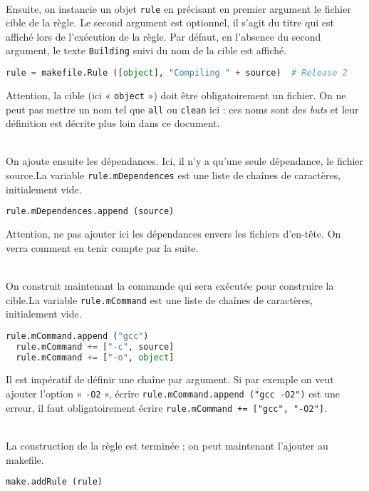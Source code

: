 \documentclass[a4paper,11pt]{extarticle}
\begin{document}
~\\Ensuite, on instancie un objet \texttt{rule} en précisant en premier argument le fichier cible de la règle. Le second argument est optionnel, il s'agit du titre qui est affiché lors de l'exécution de la règle. Par défaut, en l'absence du second argument, le texte \texttt{Building} suivi du nom de la cible est affiché. 
\begin{lstlisting}[language=py]
  rule = makefile.Rule ([object], "Compiling " + source)  # Release 2
\end{lstlisting}
Attention, la cible (ici « \texttt{object} ») doit être obligatoirement un fichier. On ne peut pas mettre un nom tel que \texttt{all} ou \texttt{clean} ici : ces noms sont des \emph{buts} et leur définition est décrite plus loin dans ce document.

~\\On ajoute ensuite les dépendances. Ici, il n'y a qu'une seule dépendance, le fichier source.La variable \texttt{rule.mDependences} est une liste de chaînes de caractères, initialement vide.
\begin{lstlisting}[language=py]
  rule.mDependences.append (source)
\end{lstlisting}
Attention, ne pas ajouter ici les dépendances envers les fichiers d'en-tête. On verra comment en tenir compte par la suite.

~\\On construit maintenant la commande qui sera exécutée pour construire la cible.La variable \texttt{rule.mCommand} est une liste de chaînes de caractères, initialement vide.
\begin{lstlisting}[language=py]
  rule.mCommand.append ("gcc")
  rule.mCommand += ["-c", source]
  rule.mCommand += ["-o", object]
\end{lstlisting}
Il est impératif de définir une chaîne par argument. Si par exemple on veut ajouter l'option « \texttt{-O2} », écrire \texttt{rule.mCommand.append ("gcc -O2")} est une erreur, il faut obligatoirement écrire \texttt{rule.mCommand += ["gcc", "-O2"]}.

~\\La construction de la règle est terminée ; on peut maintenant l'ajouter au makefile.
\begin{lstlisting}[language=py]
  make.addRule (rule)
\end{lstlisting}
\end{document}
